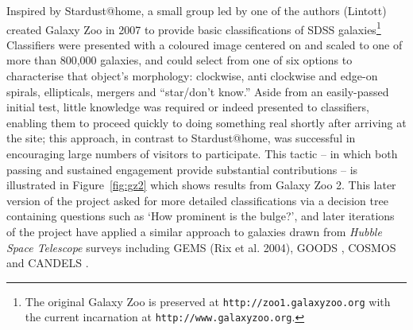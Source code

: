 \documentclass{ar2e}
\def\Fref#1{Figure~\ref{#1}\xspace}
\def\url#1{\texttt{#1}}
\begin{document}
Inspired by Stardust@home, a small group led by one of the authors (Lintott) created
Galaxy Zoo in 2007 to provide basic classifications of SDSS
galaxies\footnote{The original Galaxy Zoo is preserved at
\url{http://zoo1.galaxyzoo.org} with the current incarnation at
\url{http://www.galaxyzoo.org}.} Classifiers were presented with a coloured
image centered on and scaled to one of more than 800,000 galaxies, and could
select from one of six options to characterise that object's morphology: 
clockwise, anti clockwise and edge-on spirals,
ellipticals, mergers and ``star/don't know.'' Aside from  an easily-passed
initial test, little knowledge was required or indeed presented to classifiers,
enabling them to proceed quickly to doing something real 
shortly after arriving at the
site; this approach, in contrast to Stardust@home, was
successful in encouraging large numbers of visitors to participate. 
This tactic -- in which both passing and sustained engagement provide
substantial contributions -- is illustrated in \Fref{fig:gz2} which shows results from
Galaxy Zoo 2. This later version of the project asked for more detailed
classifications via a decision tree containing questions such as `How prominent
is the bulge?', and later iterations of the project have applied a similar
approach to galaxies drawn from \textit{Hubble Space Telescope} surveys including GEMS (Rix et al. 2004),
GOODS \citep{GOODS}, COSMOS \citep{COSMOSa,COSMOSb} and 
CANDELS \citep{CANDELSa,CANDELSb}.
\end{document}
